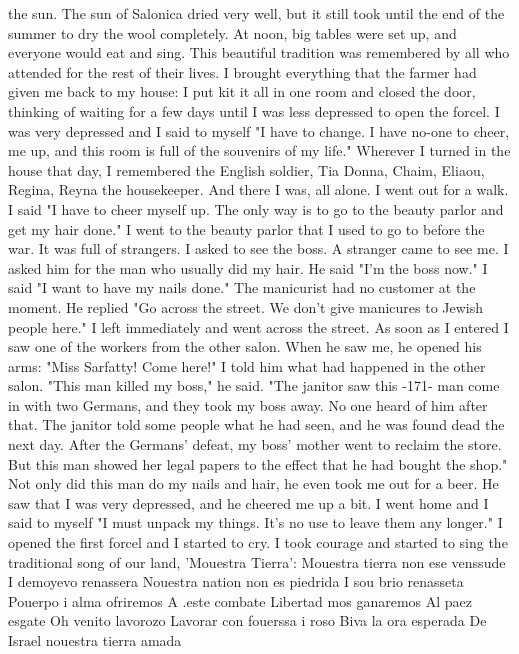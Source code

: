 the sun.
The sun of Salonica dried very well, but it still took until 
the end of the summer to dry the wool completely.
At noon, big tables 
were set up, and everyone would eat and sing.
This beautiful tradition 
was remembered by all who attended for the rest of their lives.
I brought everything that the farmer had given me back to my house: 
I put kit it all in one room and closed the door, thinking of waiting for 
a few days until I was less depressed to open the forcel.
I was very depressed and I said to myself "I have to change.
I have no-one to cheer, 
me up, and this room is full of the souvenirs of my life."
Wherever I 
turned in the house that day, I remembered the English soldier, Tia Donna, 
Chaim, Eliaou, Regina, Reyna the housekeeper.
And there I was, all alone.
I went out for a walk.
I said "I have to cheer myself up.
The only 
way is to go to the beauty parlor and get my hair done."
I went to the 
beauty parlor that I used to go to before the war.
It was full of strangers.
I asked to see the boss.
A stranger came to see me.
I asked him
for the man who usually did my hair.
He said "I'm the boss now."
I said 
"I want to have my nails done."
The manicurist had no customer at the 
moment.
He replied "Go across the street.
We don't give manicures to 
Jewish people here."
I left immediately and went across the street.
As soon as I entered
I saw one of the workers from the other salon.
When he saw me, he opened his arms: "Miss Sarfatty!
Come here!"
I told him what had happened 
in the other salon.
"This man killed my boss," he said.
"The janitor saw this 
-171- 
man come in with two Germans, and they took my boss away.
No one heard 
of him after that.
The janitor told some people what he had seen, and 
he was found dead the next day.
After the Germans' defeat, my boss' mother went to reclaim the store.
But this man showed her legal papers to 
the effect that he had bought the shop."
Not only did this man do my nails and hair, he even took me out for 
a beer.
He saw that I was very depressed, and he cheered me up a bit.
I went home and I said to myself "I must unpack my things.
It's no use 
to leave them any longer."
I opened the first forcel and I started to 
cry.
I took courage and started to sing the traditional song of our 
land, 'Mouestra Tierra': 
Mouestra tierra non ese venssude 
I demoyevo renassera 
Nouestra nation non es piedrida 
I sou brio renasseta 
Pouerpo i alma ofriremos 
A .este combate 
Libertad mos ganaremos 
Al paez esgate 
Oh venito lavorozo 
Lavorar con fouerssa i roso 
Biva la ora esperada 
De Israel nouestra tierra amada 
